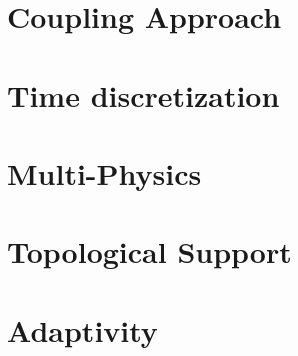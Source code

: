 \documentclass[12pt]{report}
\begin{document}
\section{Coupling Approach}


\section{Time discretization}


\section{Multi-Physics}


\section{Topological Support}


\section{Adaptivity}




\end{document}
